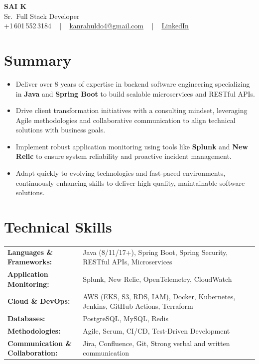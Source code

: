 \documentclass[letterpaper,11pt]{article}
\newcommand{\resumeItem}[1]{
  \item\footnotesize{
    {#1 \vspace{-2pt}}
  }
}
\newcommand{\resumeItemListStart}{\begin{itemize}[leftmargin=*]}
\newcommand{\resumeItemListEnd}{\end{itemize}\vspace{-5pt}}
\begin{document}
\begin{center}
    {\fontsize{14pt}{12pt}\selectfont \textbf{\MakeUppercase{Sai K}}}\\ \vspace{2pt}
    \fontsize{10pt}{12pt}\selectfont Sr.\ Full Stack Developer\\ \vspace{2pt}
    \fontsize{10pt}{12pt}\selectfont +1\,601\,552\,3184 ~ | ~
    \href{mailto:kanrahuldo4@gmail.com}{kanrahuldo4@gmail.com} ~ | ~
    \href{https://www.linkedin.com/in/srrrk/}{\color{blue}\underline{LinkedIn}}
    \vspace{-10pt}
\end{center}

\section{Summary}
\fontsize{9pt}{10pt}\selectfont
\resumeItemListStart
  \resumeItem{Deliver over 8 years of expertise in backend software engineering specializing in \textbf{Java} and \textbf{Spring Boot} to build scalable microservices and RESTful APIs.}
  \resumeItem{Drive client transformation initiatives with a consulting mindset, leveraging Agile methodologies and collaborative communication to align technical solutions with business goals.}
  \resumeItem{Implement robust application monitoring using tools like \textbf{Splunk} and \textbf{New Relic} to ensure system reliability and proactive incident management.}
  \resumeItem{Adapt quickly to evolving technologies and fast-paced environments, continuously enhancing skills to deliver high-quality, maintainable software solutions.}
\resumeItemListEnd
\vspace{-6pt}

\section{Technical Skills}
\vspace{-14pt}
\begin{table}[h]
\fontsize{9pt}{10pt}\selectfont
\begin{tabular}{p{0.3\linewidth} p{0.7\linewidth}}
\textbf{Languages \& Frameworks:} & Java (8/11/17+), Spring Boot, Spring Security, RESTful APIs, Microservices \\
\textbf{Application Monitoring:} & Splunk, New Relic, OpenTelemetry, CloudWatch \\
\textbf{Cloud \& DevOps:} & AWS (EKS, S3, RDS, IAM), Docker, Kubernetes, Jenkins, GitHub Actions, Terraform \\
\textbf{Databases:} & PostgreSQL, MySQL, Redis \\
\textbf{Methodologies:} & Agile, Scrum, CI/CD, Test-Driven Development \\
\textbf{Communication \& Collaboration:} & Jira, Confluence, Git, Strong verbal and written communication \\
\end{tabular}
\end{table}
\vspace{-15pt}
\end{document}
